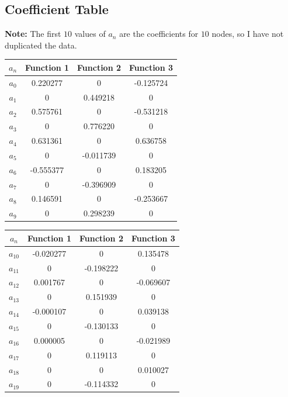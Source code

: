 \documentclass[11pt]{article} %
\begin{document}
{\subsection*{Coefficient Table}
\textbf{Note:} The first $10$ values of $a_n$ are the coefficients for $10$ nodes, so I have not duplicated the data.
\begin{table}[H]
\begin{tabular}{| c |c c c |}
\hline
$a_n$ & Function 1 & Function 2 & Function 3 \\
\hline
$a_0$ & 0.220277& 0 & -0.125724\\
$a_1$ & 0 &0.449218 & 0\\
$a_2$ &0.575761 & 0& -0.531218\\
$a_3$ & 0 &0.776220 & 0\\
$a_4$ &0.631361 & 0& 0.636758\\
$a_5$ & 0 &-0.011739& 0\\
$a_6$ &-0.555377 & 0& 0.183205\\
$a_7$ & 0 & -0.396909& 0\\
$a_8$ &0.146591 & 0&  -0.253667\\
$a_9$ & 0 & 0.298239& 0\\

\hline
\end{tabular}
\begin{tabular}{| c |c c c |}
\hline
$a_n$ & Function 1 & Function 2 & Function 3 \\
\hline
$a_{10}$ &-0.020277 & 0 & 0.135478 \\
$a_{11}$ &0 & -0.198222& 0\\
$a_{12}$ &0.001767 & 0 & -0.069607\\
$a_{13}$ &0 & 0.151939& 0\\
$a_{14}$ &-0.000107 & 0 & 0.039138\\
$a_{15}$ &0 & -0.130133& 0\\
$a_{16}$ &0.000005 & 0 & -0.021989\\
$a_{17}$ &0 &0.119113 & 0\\
$a_{18}$ &0 & 0 & 0.010027 \\
$a_{19}$ &0 & -0.114332& 0\\
\hline
\end{tabular}
\end{table}

}
\end{document}
